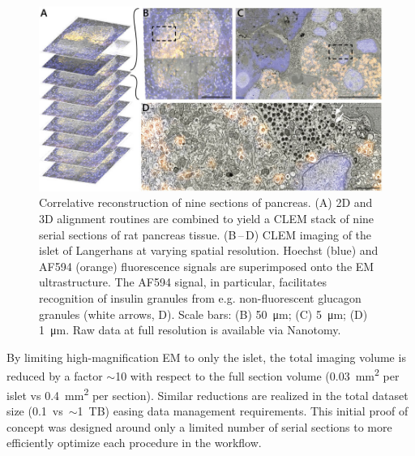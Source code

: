 \begin{figure}[!tb]
    \centering
    \includegraphics[width=\linewidth]{chapter-3/figures_JPEG_LQ/fig3-5_rat.jpg}
    \caption{Correlative reconstruction of nine sections of pancreas.
    (A) 2D and 3D alignment routines are combined to yield a CLEM stack of nine serial sections of rat pancreas tissue.
    (B\,--\,D) CLEM imaging of the islet of Langerhans at varying spatial resolution. Hoechst (blue) and AF594 (orange) fluorescence signals are superimposed onto the EM ultrastructure. The AF594 signal, in particular, facilitates recognition of insulin granules from e.g. non-fluorescent glucagon granules (white arrows, D).
    Scale bars: (B) \SI{50}{\micro\meter}; (C) \SI{5}{\micro\meter}; (D) \SI{1}{\micro\meter}.
    Raw data at full resolution is available via Nanotomy.}
    \label{fig:3.5_ratpancreas}
\end{figure}

By limiting high-magnification EM to only the islet, the total imaging volume is reduced by a factor ${\sim}$10 with respect to the full section volume (\SI{0.03}{\milli\meter^2} per islet vs \SI{0.4}{\milli\meter^2} per section). Similar reductions are realized in the total dataset size (0.1\, vs \,${\sim}$\SI{1}{TB}) easing data management requirements. This initial proof of concept was designed around only a limited number of serial sections to more efficiently optimize each procedure in the workflow.


